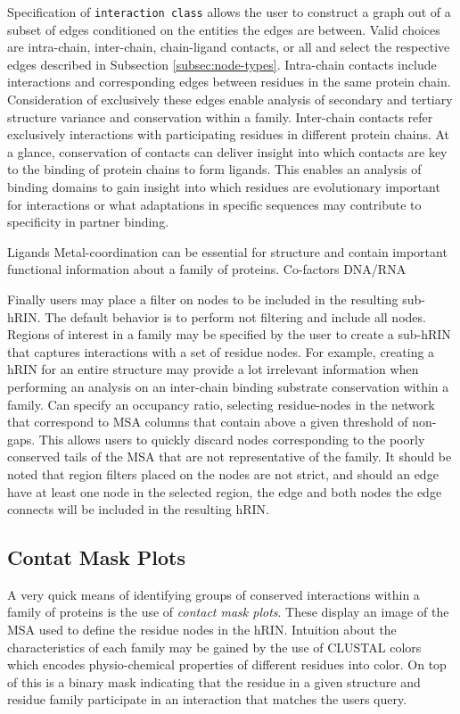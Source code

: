 Specification of \texttt{interaction class} allows the user to construct a graph out of a subset of edges conditioned on the entities the edges are between. 
Valid choices are intra-chain, inter-chain, chain-ligand contacts, or all and select the respective edges described in Subsection \ref{subsec:node-types}. 
Intra-chain contacts include interactions and corresponding edges between residues in the same protein chain. Consideration of exclusively these edges enable analysis of secondary and tertiary structure variance and conservation within a family.
Inter-chain contacts refer exclusively interactions with participating residues in different protein chains. At a glance, conservation of contacts can deliver insight into which contacts are key to the binding of protein chains to form ligands.
This enables an analysis of binding domains to gain insight into which residues are evolutionary important for interactions or what adaptations in specific sequences may contribute to specificity in partner binding.

Ligands
Metal-coordination can be essential for structure and contain important functional information about a family of proteins.
Co-factors
DNA/RNA

Finally users may place a filter on nodes to be included in the resulting sub-hRIN.
The default behavior is to perform not filtering and include all nodes.
Regions of interest in a family may be specified by the user to create a sub-hRIN that captures interactions with a set of residue nodes. For example, creating a hRIN for an entire structure may provide a lot irrelevant information when performing an analysis on an inter-chain binding substrate conservation within a family. 
Can specify an occupancy ratio, selecting residue-nodes in the network that correspond to MSA columns that contain above a given threshold of non-gaps. This allows users to quickly discard nodes corresponding to the poorly conserved tails of the MSA that are not representative of the family. 
It should be noted that region filters placed on the nodes are not strict, and should an edge have at least one node in the selected region, the edge and both nodes the edge connects will be included in the resulting hRIN.

\subsection{Contat Mask Plots}
\label{sec:contact-masks}
A very quick means of identifying groups of conserved interactions within a family of proteins is the use of \emph{contact mask plots}. These display an image of the MSA used to define the residue nodes in the hRIN. Intuition about the characteristics of each family may be gained by the use of CLUSTAL colors which encodes physio-chemical properties of different residues into color. On top of this is a binary mask indicating that the residue in a given structure and residue family participate in an interaction that matches the users query.



